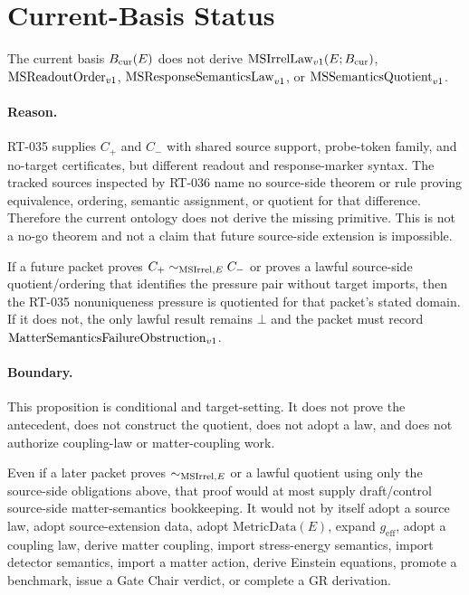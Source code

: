 \section{Current-Basis Status}

\begin{proposition}
The current basis \(B_{\mathrm{cur}}(E)\) does not derive \(\mathrm{MSIrrelLaw}_{v1}(E;B_{\mathrm{cur}})\),
\(\mathrm{MSReadoutOrder}_{v1}\), \(\mathrm{MSResponseSemanticsLaw}_{v1}\), or \(\mathrm{MSSemanticsQuotient}_{v1}\).
\end{proposition}

\paragraph{Reason.}
RT-035 supplies \(C_+\) and \(C_-\) with shared source support, probe-token
family, and no-target certificates, but different readout and response-marker
syntax.  The tracked sources inspected by RT-036 name no source-side theorem
or rule proving equivalence, ordering, semantic assignment, or quotient for
that difference.  Therefore the current ontology does not derive the missing
primitive.  This is not a no-go theorem and not a claim that future
source-side extension is impossible.

\begin{proposition}
If a future packet proves \(C_+\sim_{\mathrm{MSIrrel},E} C_-\) or proves a lawful source-side
quotient/ordering that identifies the pressure pair without target imports,
then the RT-035 nonuniqueness pressure is quotiented for that packet's stated
domain.  If it does not, the only lawful result remains \(\bot\) and the
packet must record \(\mathrm{MatterSemanticsFailureObstruction}_{v1}\).
\end{proposition}

\paragraph{Boundary.}
This proposition is conditional and target-setting.  It does not prove the
antecedent, does not construct the quotient, does not adopt a law, and does
not authorize coupling-law or matter-coupling work.

\begin{proposition}
Even if a later packet proves \(\sim_{\mathrm{MSIrrel},E}\) or a lawful quotient using only
the source-side obligations above, that proof would at most supply
draft/control source-side matter-semantics bookkeeping.  It would not by
itself adopt a source law, adopt source-extension data, adopt
\(\mathrm{MetricData}(E)\), expand \(g_{\mathrm{eff}}\), adopt a coupling law,
derive matter coupling, import stress-energy semantics, import detector
semantics, import a matter action, derive Einstein equations, promote a
benchmark, issue a Gate Chair verdict, or complete a GR derivation.
\end{proposition}

